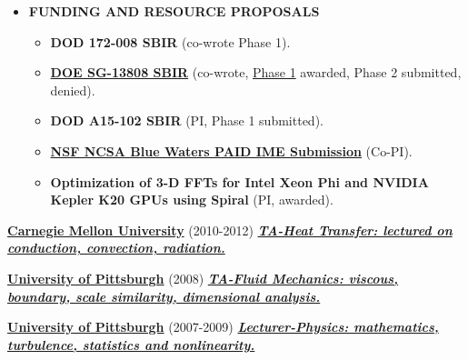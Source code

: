 \documentclass{article}
\newcommand{\employer}[3]{{ \textbf{#1} (#2) \underline{\textbf{\emph{#3}}}\\  }}
\newenvironment{achievements}{\begin{list}{$\bullet$}{\topsep 0pt \itemsep -2pt}}{\vspace*{4pt}\end{list}}
\begin{document}
\begin{itemize}
\item \textbf{FUNDING AND RESOURCE PROPOSALS}
        \begin{itemize}
          \item \textbf{DOD 172-008 SBIR} (co-wrote Phase 1).
          \item \textbf{\href{http://science.energy.gov/sbir/}{DOE SG-13808 SBIR}} (co-wrote, \href{https://www.osti.gov/scitech/servlets/purl/1242462}{Phase 1} awarded, Phase 2 submitted, denied).
          \item \textbf{DOD A15-102 SBIR} (PI, Phase 1 submitted).
          \item \textbf{\href{https://bluewaters.ncsa.illinois.edu/paid-ime-submissions}{NSF NCSA Blue Waters PAID IME Submission}} (Co-PI).
          \item \textbf{Optimization of 3-D FFTs for Intel Xeon Phi and NVIDIA Kepler K20 GPUs using Spiral} (PI, awarded).
        \end{itemize}


    \end{itemize}



\employer{\href{https://www.cmu.edu/me/}{Carnegie Mellon University}}{2010-2012}{TA-Heat Transfer: lectured on conduction, convection, radiation.}

\employer{\href{http://www.engineering.pitt.edu/MEMS/}{University of Pittsburgh}}{2008}{TA-Fluid Mechanics: viscous, boundary, scale similarity, dimensional analysis.}

\employer{\href{http://www.physicsandastronomy.pitt.edu/}{University of Pittsburgh}}{2007-2009}{Lecturer-Physics: mathematics, turbulence, statistics and nonlinearity.}
\end{document}
